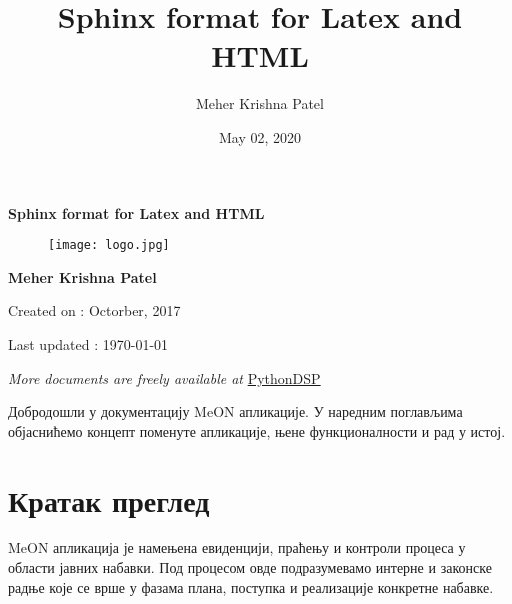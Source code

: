 \documentclass[a4paper,10pt,english]{report}
\title{Sphinx format for Latex and HTML}
\date{May 02, 2020}
\author{Meher Krishna Patel}
\begin{document}
\pagestyle{empty}


        \begin{titlepage}
            \centering

            \vspace*{40mm} %
            \textbf{\Huge {Sphinx format for Latex and HTML}}

            \vspace{0mm}
            \begin{figure}[!h]
                \centering
                \texttt{[image: logo.jpg]}
            \end{figure}

            \vspace{0mm}
            \Large \textbf{{Meher Krishna Patel}}

            \small Created on : Octorber, 2017

            \vspace*{0mm}
            \small  Last updated : \MonthYearFormat\today


            \vfill
            \small \textit{More documents are freely available at }{\href{http://pythondsp.readthedocs.io/en/latest/pythondsp/toc.html}{PythonDSP}}
        \end{titlepage}

        \clearpage
        \tableofcontents
        \listoffigures
        \listoftables
        \clearpage

        
\pagestyle{plain}
 
\pagestyle{normal}
\label{\detokenize{index::doc}}


Добродошли у документацију MeON апликације. У наредним поглављима објаснићемо концепт поменуте апликације, њене функционалности и рад у истој.


\chapter{Кратак преглед}
\label{\detokenize{uvod/index:id1}}\label{\detokenize{uvod/index::doc}}
MeON апликација је намењена евиденцији, праћењу и контроли процеса у области јавних набавки. Под процесом овде подразумевамо интерне и законске радње које се врше у фазама плана, поступка и реализације конкретне набавке.
\end{document}
